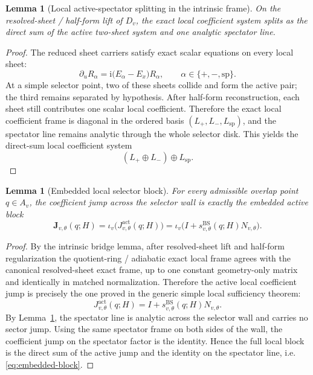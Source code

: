 \documentclass[11pt]{article}
\numberwithin{equation}{section}
\newtheorem{lemma}[theorem]{Lemma}
\theoremstyle{definition}
\newcommand{\ii}{\mathrm i}
\newcommand{\Jact}{J^{\mathrm{act}}_{v,\theta}}
\newcommand{\Jemb}{\mathbf J_{v,\theta}}
\begin{document}
\begin{lemma}[Local active-spectator splitting in the intrinsic frame]
\label{lem:active-spectator}
On the resolved-sheet / half-form lift of $D_v$, the exact local coefficient system splits as the direct sum of the active two-sheet system and one analytic spectator line.
\end{lemma}

\begin{proof}
The reduced sheet carriers satisfy exact scalar equations on every local sheet:
\begin{equation}
\label{eq:three-sheet-scalar}
\partial_u R_\alpha=\ii\bigl(E_\alpha-E_x\bigr)R_\alpha,
\qquad
\alpha\in\{+,-,\mathrm{sp}\}.
\end{equation}
At a simple selector point, two of these sheets collide and form the active pair; the third remains separated by hypothesis. After half-form reconstruction, each sheet still contributes one scalar local coefficient. Therefore the exact local coefficient frame is diagonal in the ordered basis $(L_+,L_-,L_{\mathrm{sp}})$, and the spectator line remains analytic through the whole selector disk. This yields the direct-sum local coefficient system
\[
(L_+\oplus L_-)\oplus L_{\mathrm{sp}}.
\]
\end{proof}

\begin{lemma}[Embedded local selector block]
\label{lem:embedded-block}
For every admissible overlap point $q\in A_v$, the coefficient jump across the selector wall is exactly the embedded active block
\begin{equation}
\label{eq:embedded-block}
\Jemb(q;H)=\iota_v\bigl(\Jact(q;H)\bigr)=\iota_v\!\bigl(I+s^{\mathrm{BS}}_{v,\theta}(q;H)N_{v,\theta}\bigr).
\end{equation}
\end{lemma}

\begin{proof}
By the intrinsic bridge lemma, after resolved-sheet lift and half-form regularization the quotient-ring / adiabatic exact local frame agrees with the canonical resolved-sheet exact frame, up to one constant geometry-only matrix and identically in matched normalization. Therefore the active local coefficient jump is precisely the one proved in the generic simple local sufficiency theorem:
\[
\Jact(q;H)=I+s^{\mathrm{BS}}_{v,\theta}(q;H)N_{v,\theta}.
\]
By Lemma~\ref{lem:active-spectator}, the spectator line is analytic across the selector wall and carries no sector jump. Using the same spectator frame on both sides of the wall, the coefficient jump on the spectator factor is the identity. Hence the full local block is the direct sum of the active jump and the identity on the spectator line, i.e. \eqref{eq:embedded-block}.
\end{proof}
\end{document}
